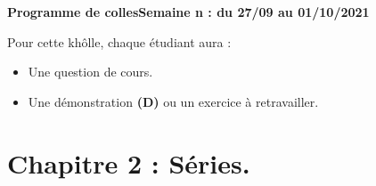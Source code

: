 \documentclass[twoside,a4paper,french,10pt]{VcCours}
\begin{document}

\begin{center}
\large\bf
Programme de collesSemaine n : du 27/09 au 01/10/2021
\end{center}
\separationTitre


Pour cette khôlle, chaque étudiant aura :
\begin{itemize}
\item Une question de cours.
\item Une démonstration \textbf{(D)} ou un exercice à retravailler.
\end{itemize}


\medskip 
\section*{Chapitre 2 : Séries.}
\end{document}
